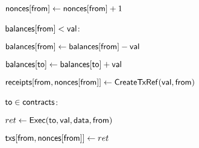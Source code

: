 
\begin{bbox}[title=\msf{ExecTx(to, val, data, from)}]

${\mathsf {nonces[from]}} \leftarrow {\mathsf {nonces[from]}} + 1$

\If ${\mathsf {balances[from]}} < {\mathsf {val}}$: \reject

${\mathsf {balances[from]}} \leftarrow {\mathsf {balances[from]}} - {\mathsf {val}}$

${\mathsf {balances[to]}} \leftarrow {\mathsf {balances[to]}} + {\mathsf {val}}$

${\mathsf {receipts[from,nonces[from]]}} \leftarrow {\mathsf {CreateTxRef(val, from)}}$

\If ${\mathsf {to}} \in {\mathsf {contracts}}$:

	\quad $ret \leftarrow {\mathsf {Exec(to, val, data, from)}}$

	\quad ${\mathsf {txs[from, nonces[from]]}} \leftarrow ret$

\end{bbox}
